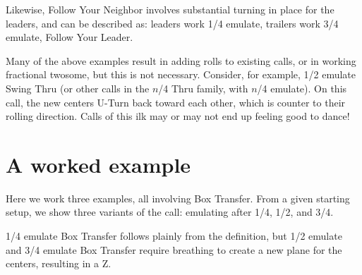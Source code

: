 \documentclass[11pt]{article}
\begin{document}
Likewise, Follow Your Neighbor involves substantial turning in place for the leaders,
and can be described as: leaders work 1/4 emulate,
trailers work 3/4 emulate, Follow Your Leader.

Many of the above examples result in adding rolls to existing calls,
or in working fractional twosome,
but this is not necessary.
Consider, for example, 1/2 emulate Swing Thru
(or other calls in the $n$/4 Thru family, with $n$/4 emulate).
On this call, the new centers U-Turn back toward each other,
which is counter to their rolling direction.
Calls of this ilk may or may not end up feeling good to dance!

\section{A worked example}

Here we work three examples, all involving Box Transfer.
From a given starting setup, we show three variants of the call:
emulating after 1/4, 1/2, and 3/4.

1/4 emulate Box Transfer
follows plainly from the definition,
but 1/2 emulate and 3/4 emulate
Box Transfer require breathing to create a new plane for the centers,
resulting in a Z.


\end{document}
